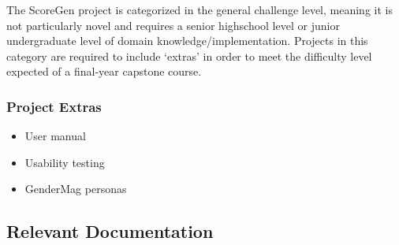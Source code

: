 \documentclass[12pt, titlepage]{article}
\begin{document}
The ScoreGen project is categorized in the general challenge level, meaning it is not particularly novel 
and requires a senior highschool level or junior undergraduate level of domain knowledge/implementation. 
Projects in this category are required to include ‘extras’ in order to meet the difficulty level expected 
of a final-year capstone course.

\subsubsection{Project Extras}
\begin{itemize}
  \item User manual
  \item Usability testing
  \item GenderMag personas
\end{itemize}

\subsection{Relevant Documentation}
\end{document}
